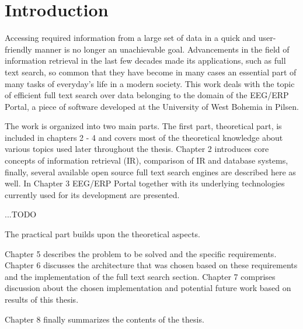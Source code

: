 
\chapter{Introduction}

Accessing required information from a large set of data in a quick
and user-friendly manner is no longer an unachievable goal. 
Advancements in the field of information retrieval in the last few decades made its applications, such as full text search, so common that they have become in many cases an essential part of many tasks of everyday's life in a modern society. 
This work deals with the topic of efficient full text search over data belonging to the domain of the EEG/ERP Portal, a piece of software developed at the University of West Bohemia in Pilsen. 

The work is organized into two main parts.
The first part, theoretical part, is included in chapters 2 - 4 and covers most of the theoretical knowledge about various topics used later throughout the thesis. 
Chapter 2 introduces core concepts of information retrieval (IR), comparison of IR and database systems, finally, several available open source full text search engines are described here as well. 
In Chapter 3 EEG/ERP Portal together with its underlying technologies currently used for its development are presented. 

...TODO

The practical part builds upon the theoretical aspects.

Chapter 5 describes the problem to be solved and the specific requirements.
Chapter 6 discusses the architecture that was chosen based on these
requirements and the implementation of the full text search section.
Chapter 7 comprises discussion about the chosen implementation and
potential future work based on results of this thesis.

Chapter 8 finally summarizes the contents of the thesis.
